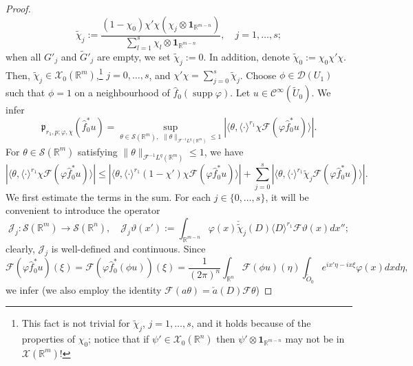 \documentclass[12pt,reqno]{amsart}
\newcommand{\RR}{\mathbb R}
\newcommand{\DD}{\mathcal D}
\newcommand{\SSS}{\mathcal S}
\newcommand{\XX}{\mathcal X}
\newcommand{\supp}{\operatorname{supp}}
\theoremstyle{plain}
\theoremstyle{remark}
\theoremstyle{definition}
\numberwithin{equation}{section}
\begin{document}
\begin{proof}
\begin{equation*}
\widetilde{\chi}_j:=\frac{(1-\chi_0)\chi'\chi(\chi_j\otimes\mathbf{1}_{\RR^{m-n}})}{\sum_{l=1}^s\chi_l\otimes \mathbf{1}_{\RR^{m-n}}},\quad j=1,\ldots,s;
\end{equation*}
when all $G'_j$ and $\widetilde{G}'_j$ are empty, we set $\widetilde{\chi}_j:=0$. In addition, denote $\widetilde{\chi}_0:=\chi_0\chi'\chi$. Then, $\widetilde{\chi}_j\in\XX_0(\RR^m)$,\footnote{This fact is not trivial for $\widetilde{\chi}_j$, $j=1,\ldots,s$, and it holds because of the properties of $\chi_0$; notice that if $\psi'\in\XX_0(\RR^n)$ then $\psi'\otimes\mathbf{1}_{\RR^{m-n}}$ may not be in $\XX(\RR^m)$!} $j=0,\ldots,s$, and $\chi'\chi=\sum_{j=0}^s\widetilde{\chi}_j$. Choose $\phi\in\DD(U_1)$ such that $\phi=1$ on a neighbourhood of $\hat{f}_0(\supp\varphi)$. Let $u\in\mathcal{C}^{\infty}(\widetilde{U}_0)$. We infer
\begin{equation}\label{est-for-uin-seminormsofcos}
\mathfrak{p}_{r_1,p;\varphi,\chi}(\hat{f}^*_0u)=\sup_{\theta\in\SSS(\RR^m),\,\ \|\theta\|_{\mathcal{F}^{-1}L^q(\RR^m)}\leq 1}|\langle \theta,\langle\cdot\rangle^{r_1}\chi\mathcal{F}(\varphi \hat{f}_0^*u)\rangle|.
\end{equation}
For $\theta\in\SSS(\RR^m)$ satisfying $\|\theta\|_{\mathcal{F}^{-1}L^q(\RR^m)}\leq 1$, we have
\begin{equation}\label{est-for-mai-reskls}
|\langle \theta,\langle\cdot\rangle^{r_1}\chi\mathcal{F}(\varphi \hat{f}_0^*u)\rangle|\leq |\langle \theta,\langle\cdot\rangle^{r_1}(1-\chi')\chi\mathcal{F}(\varphi \hat{f}_0^*u)\rangle|+\sum_{j=0}^s|\langle \theta,\langle\cdot\rangle^{r_1}\widetilde{\chi}_j\mathcal{F}(\varphi \hat{f}_0^*u)\rangle|.
\end{equation}
We first estimate the terms in the sum. For each $j\in\{0,\ldots,s\}$, it will be convenient to introduce the operator
\begin{equation*}
\mathcal{J}_j:\SSS(\RR^m)\rightarrow\SSS(\RR^n),\quad \mathcal{J}_j\vartheta(x'):=\int_{\RR^{m-n}}\varphi(x)\check{\widetilde{\chi}}_j(D)\langle D\rangle^{r_1}\mathcal{F}\vartheta(x)dx'';
\end{equation*}
clearly, $\mathcal{J}_j$ is well-defined and continuous. Since
\begin{equation*}
\mathcal{F}(\varphi \hat{f}_0^*u)(\xi)=\mathcal{F}(\varphi \hat{f}_0^*(\phi u))(\xi)=\frac{1}{(2\pi)^n}\int_{\RR^n}\mathcal{F}(\phi u)(\eta)\int_{\widetilde{O}_0}e^{ix'\eta-ix\xi}\varphi(x)dxd\eta,
\end{equation*}
we infer (we also employ the identity $\mathcal{F}(a\theta)=\check{a}(D)\mathcal{F}\theta$)

\end{proof}
\end{document}
